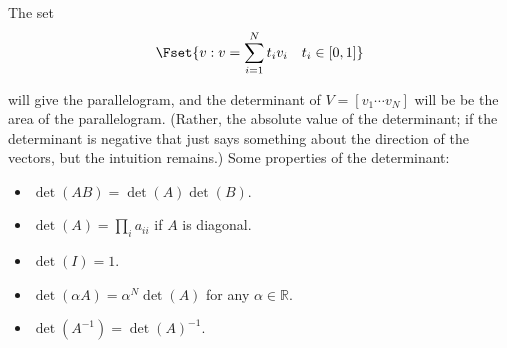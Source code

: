\documentclass{article}
\begin{document}
The set
\[
  \Fset{v: v = \sum^{N}_{i = 1} t_i v_i \quad t_i \in [0, 1]}
\]

will give the parallelogram, and the determinant of $V = [v_1 \cdots v_N]$ will be be the area of the parallelogram. (Rather, the absolute value of the determinant; if the determinant is negative that just says something about the direction of the vectors, but the intuition remains.) Some properties of the determinant:
\begin{itemize}[label=$\bullet$]
  \item $\det(AB) = \det(A) \det(B)$.
  \item $\det(A) = \prod_{i} a_{ii}$ if $A$ is diagonal.
  \item $\det(I) = 1$.
  \item $\det(\alpha A) = \alpha^N \det(A)$ for any $\alpha \in \mathbb{R}$.
  \item $\det(A^{-1}) = \det(A)^{-1}$.
\end{itemize}
\end{document}

